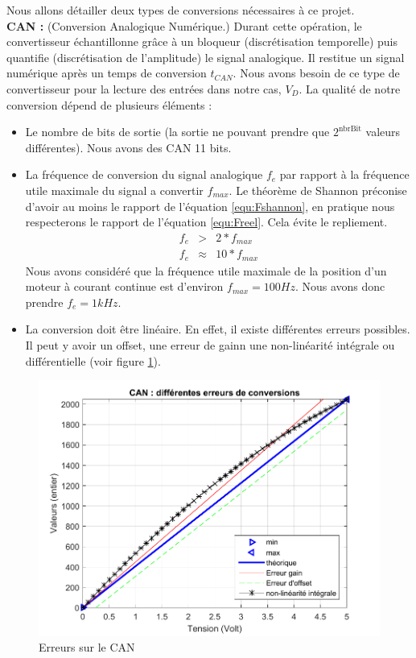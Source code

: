 Nous allons détailler deux types de conversions nécessaires à ce projet. \\
\hspace{3mm} \textbf{CAN :} (Conversion Analogique Numérique.) Durant cette opération, le convertisseur échantillonne grâce à un bloqueur (discrétisation temporelle) puis quantifie (discrétisation de l'amplitude) le signal analogique. Il restitue un signal numérique après un temps de conversion $t_{CAN}$. Nous avons besoin de ce type de convertisseur pour la lecture des entrées dans notre cas, $V_{D}$. La qualité de notre conversion dépend de plusieurs éléments : 
\begin{itemize}
\item Le nombre de bits de sortie (la sortie ne pouvant prendre que $2^{\text{nbrBit}}$ valeurs différentes). Nous avons des CAN 11 bits.
\item La fréquence de conversion du signal analogique $f_{e}$ par rapport à la fréquence utile maximale du signal a convertir $f_{max}$. Le théorème de Shannon préconise d'avoir au moins le rapport de l'équation \ref{equ:Fshannon}, en pratique nous respecterons le rapport de l'équation \ref{equ:Freel}. Cela évite le repliement.
\begin{eqnarray}
\label{equ:Fshannon} f_e &>& 2*f_{max}\\
\label{equ:Freel} f_e & \approx & 10*f_{max}
\end{eqnarray}
Nous avons considéré que la fréquence utile maximale de la position d'un moteur à courant continue est d'environ $f_{max} = 100Hz$. Nous avons donc prendre $f_e = 1kHz$.
\item La conversion doit être linéaire. En effet, il existe différentes erreurs possibles. Il peut y avoir un offset, une erreur de gainn une non-linéarité intégrale ou différentielle (voir figure \ref{fig:errCAN}).
\end{itemize}
\begin{figure}[!ht]
\centering 
\includegraphics[width=.6\textwidth]{./V/images/CAN.pdf}
\caption{\label{fig:errCAN}Erreurs sur le CAN}
\end{figure}

